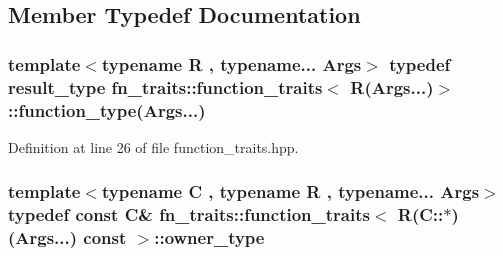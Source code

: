 \subsection{Member Typedef Documentation}
\subsubsection[{\texorpdfstring{function\+\_\+type}{function_type}}]{\setlength{\rightskip}{0pt plus 5cm}template$<$typename R , typename... Args$>$ typedef {\bf result\+\_\+type} {\bf fn\+\_\+traits\+::function\+\_\+traits}$<$ R(Args...)$>$\+::function\+\_\+type(Args...)\hspace{0.3cm}{\ttfamily [inherited]}}\hypertarget{structfn__traits_1_1function__traits_3_01_r_07_args_8_8_8_08_4_a85e5883a1c8050fe442c1072386b2d11}{}\label{structfn__traits_1_1function__traits_3_01_r_07_args_8_8_8_08_4_a85e5883a1c8050fe442c1072386b2d11}


Definition at line 26 of file function\+\_\+traits.\+hpp.

\subsubsection[{\texorpdfstring{owner\+\_\+type}{owner_type}}]{\setlength{\rightskip}{0pt plus 5cm}template$<$typename C , typename R , typename... Args$>$ typedef const C\& {\bf fn\+\_\+traits\+::function\+\_\+traits}$<$ R(C\+::$\ast$)(Args...) const  $>$\+::{\bf owner\+\_\+type}}\hypertarget{structfn__traits_1_1function__traits_3_01_r_07_c_1_1_5_08_07_args_8_8_8_08_01const_01_01_4_af861070a9fa7ecbcc812135e16232e9a}{}\label{structfn__traits_1_1function__traits_3_01_r_07_c_1_1_5_08_07_args_8_8_8_08_01const_01_01_4_af861070a9fa7ecbcc812135e16232e9a}


